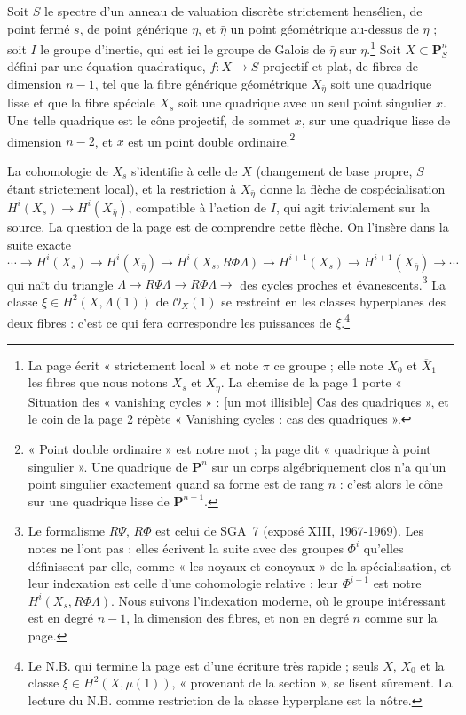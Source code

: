 \documentclass[11pt,a4paper]{article}
\begin{document}
Soit $S$ le spectre d'un anneau de valuation discrète strictement
hensélien, de point fermé $s$, de point générique $\eta$, et $\bar\eta$ un
point géométrique au-dessus de $\eta$ ; soit $I$ le groupe d'inertie,
qui est ici le groupe de Galois de $\bar\eta$ sur $\eta$.\footnote{La page
écrit « strictement local » et note $\pi$ ce groupe ; elle note $X_{0}$
et $\overline{X}_{1}$ les fibres que nous notons $X_{s}$ et
$X_{\bar\eta}$. La chemise de la page 1 porte « Situation des
« vanishing cycles » : [un mot illisible] Cas des quadriques », et
le coin de la page 2 répète « Vanishing cycles : cas des quadriques ».}
Soit $X \subset \mathbf{P}^{n}_{S}$ défini par une équation quadratique,
$f : X \to S$ projectif et plat, de fibres de dimension $n - 1$, tel que
la fibre générique géométrique $X_{\bar\eta}$ soit une quadrique lisse et
que la fibre spéciale $X_{s}$ soit une quadrique avec un seul point
singulier $x$. Une telle quadrique est le cône projectif, de sommet $x$,
sur une quadrique lisse de dimension $n - 2$, et $x$ est un point double
ordinaire.\footnote{« Point double ordinaire » est notre mot ; la page
dit « quadrique à point singulier ». Une quadrique de $\mathbf{P}^{n}$
sur un corps algébriquement clos n'a qu'un point singulier exactement
quand sa forme est de rang $n$ : c'est alors le cône sur une quadrique
lisse de $\mathbf{P}^{n-1}$.}

La cohomologie de $X_{s}$ s'identifie à celle de $X$ (changement de base
propre, $S$ étant strictement local), et la restriction à $X_{\bar\eta}$
donne la flèche de cospécialisation
$H^{i}(X_{s}) \to H^{i}(X_{\bar\eta})$, compatible à l'action de $I$, qui
agit trivialement sur la source. La question de la page est de comprendre
cette flèche. On l'insère dans la suite exacte
\[
  \cdots \to H^{i}(X_{s}) \to H^{i}(X_{\bar\eta}) \to H^{i}(X_{s}, R\Phi\Lambda)
  \to H^{i+1}(X_{s}) \to H^{i+1}(X_{\bar\eta}) \to \cdots
\]
qui naît du triangle $\Lambda \to R\Psi\Lambda \to R\Phi\Lambda \to$ des
cycles proches et évanescents.\footnote{Le formalisme $R\Psi$, $R\Phi$ est
celui de SGA~7 (exposé XIII, 1967-1969). Les notes ne l'ont pas : elles
écrivent la suite avec des groupes $\Phi^{i}$ qu'elles définissent par elle,
comme « les noyaux et conoyaux » de la spécialisation, et leur
indexation est celle d'une cohomologie relative : leur $\Phi^{i+1}$ est
notre $H^{i}(X_{s}, R\Phi\Lambda)$. Nous suivons l'indexation moderne, où le
groupe intéressant est en degré $n - 1$, la dimension des fibres, et non en
degré $n$ comme sur la page.} La classe $\xi \in H^{2}(X, \Lambda(1))$ de
$\mathcal{O}_{X}(1)$ se restreint en les classes hyperplanes des deux
fibres : c'est ce qui fera correspondre les puissances de $\xi$.\footnote{Le
N.B. qui termine la page est d'une écriture très rapide ; seuls $X$, $X_{0}$
et la classe $\xi \in H^{2}(X, \mu(1))$, « provenant de la section »,
se lisent sûrement. La lecture du N.B. comme restriction de la classe
hyperplane est la nôtre.}
\end{document}
